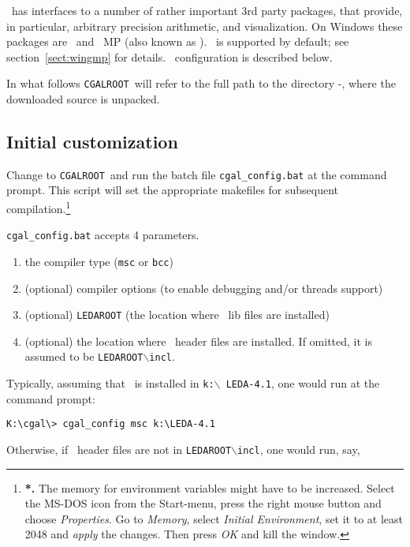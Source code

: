 \cgal\ has interfaces to a number of rather important 3rd party
packages, that provide, in particular, arbitrary precision arithmetic,
and visualization. On Windows these packages are \leda\ and \gnu\ MP
(also known as \gmp ).  \gmp\ is supported by default; see
section~\ref{sect:wingmp} for details.  \leda\ configuration is
described below.

\newcommand{\CGALR}{\texttt{CGALROOT}}
\newcommand{\bslsh}{$\backslash$}

In what follows \CGALR\ will refer to the full path to the
directory \cgal-\cgalrelease , where the downloaded source is
unpacked.

\subsection{Initial customization}\label{subs::inicu}

Change to \CGALR\ and run the batch file \texttt{cgal\_config.bat} at the
command prompt.  This script will set the appropriate makefiles for
subsequent compilation.\footnote{
{\bf {}*.} 
The memory for environment variables might have to be increased.
Select the MS-DOS icon from the Start-menu, press the right mouse
button and choose \textit{Properties}. Go to \textit{Memory}, select
\textit{Initial Environment}, set it to at least 2048 and
\textit{apply} the changes. Then press \textit{OK} and kill the window.
}

\texttt{cgal\_config.bat} accepts 4 parameters.
\begin{enumerate}
\item the compiler type (\texttt{msc} or \texttt{bcc})
%
\item (optional) compiler options (to enable debugging and/or threads
                support)
%
\item (optional) \texttt{LEDAROOT} (the location where \leda\ lib files are installed)
%
\item (optional) the location where \leda\ header files are installed.
                If omitted, it is assumed to be 
\texttt{LEDAROOT\bslsh incl}.
\end{enumerate}

Typically, assuming that \leda\ is installed in \texttt{k:\bslsh
  LEDA-4.1}, one would run at the command prompt:
\begin{verbatim}
K:\cgal\> cgal_config msc k:\LEDA-4.1
\end{verbatim}

Otherwise, if \leda\ header files are not in \texttt{LEDAROOT\bslsh incl}, 
one would run, say,

